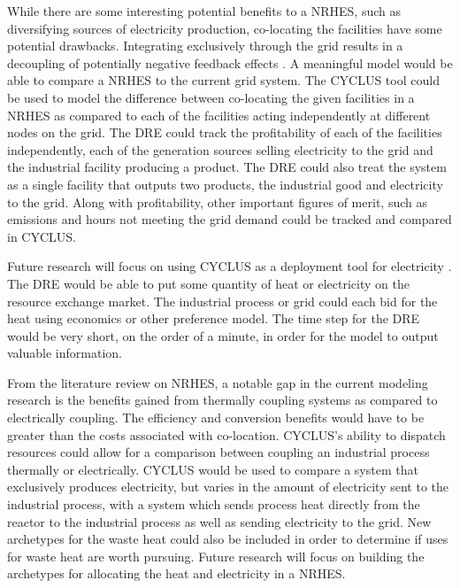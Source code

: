 \documentclass{article}                                                                           %
\begin{document}
\begin{linenumbers}
While there are some interesting potential benefits to a NRHES, such as diversifying sources of electricity production, co-locating the facilities have some potential drawbacks.  Integrating exclusively through the grid results in a decoupling of potentially negative feedback effects \cite{Harrison2016}.  A meaningful model would be able to compare a NRHES to the current grid system. The CYCLUS tool could be used to model the difference between co-locating the given facilities in a NRHES as compared to each of the facilities acting independently at different nodes on the grid.  The DRE could track the profitability of each of the facilities independently, each of the generation sources selling electricity to the grid and the industrial facility producing a product.  The DRE could also treat the system as a single facility that outputs two products, the industrial good and electricity to the grid. Along with profitability, other important figures of merit, such as emissions and hours not meeting the grid demand could be tracked and compared in CYCLUS. 

Future research will focus on using CYCLUS as a deployment tool for electricity \cite{redfoot_rabiti_2017}. The DRE would be able to put some quantity of heat or electricity on the resource exchange market.  The industrial process or grid could each bid for the heat using economics or other preference model.  The time step for the DRE would be very short, on the order of a minute, in order for the model to output valuable information. 

From the literature review on NRHES, a notable gap in the current modeling research is the benefits gained from thermally coupling systems as compared to electrically coupling.  The efficiency and conversion benefits would have to be greater than the costs associated with co-location.  CYCLUS's ability to dispatch resources could allow for a comparison between coupling an industrial process thermally or electrically. CYCLUS would be used to compare a system that exclusively produces electricity, but varies in the amount of electricity sent to the industrial process, with a system which sends process heat directly from the reactor to the industrial process as well as sending electricity to the grid.   New archetypes for the waste heat could also be included in order to determine if uses for waste heat are worth pursuing.  Future research will focus on building the archetypes for allocating the heat and electricity in a NRHES.  


\end{linenumbers}
\end{document}
